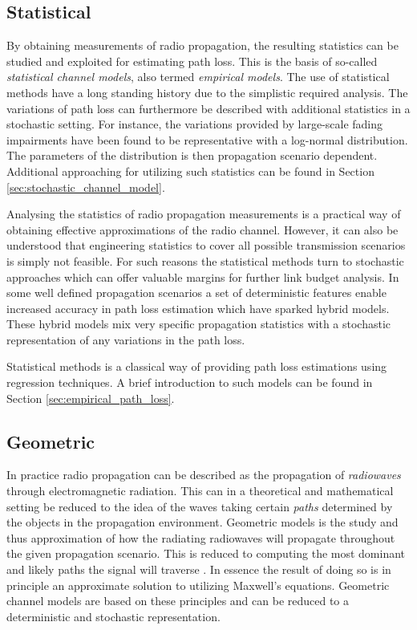 \subsection{Statistical}
By obtaining measurements of radio propagation, the resulting statistics can be studied and exploited for estimating path loss. This is the basis of so-called \emph{statistical channel models}, also termed \emph{empirical models}. The use of statistical methods have a long standing history due to the simplistic required analysis. The variations of path loss can furthermore be described with additional statistics in a stochastic setting. For instance, the variations provided by large-scale fading impairments have been found to be representative with a log-normal distribution. The parameters of the distribution is then propagation scenario dependent. Additional approaching for utilizing such statistics can be found in Section \ref{sec:stochastic_channel_model}.

Analysing the statistics of radio propagation measurements is a practical way of obtaining effective approximations of the radio channel. However, it can also be understood that engineering statistics to cover all possible transmission scenarios is simply not feasible. For such reasons the statistical methods turn to stochastic approaches which can offer valuable margins for further link budget analysis. In some well defined propagation scenarios a set of deterministic features enable increased accuracy in path loss estimation which have sparked hybrid models. These hybrid models mix very specific propagation statistics with a stochastic representation of any variations in the path loss. 

Statistical methods is a classical way of providing path loss estimations using regression techniques. A brief introduction to such models can be found in Section \ref{sec:empirical_path_loss}.


\subsection{Geometric}
In practice radio propagation can be described as the propagation of \emph{radiowaves} through electromagnetic radiation. This can in a theoretical and mathematical setting be reduced to the idea of the waves taking certain \emph{paths} determined by the objects in the propagation environment. Geometric models is the study and thus approximation of how the radiating radiowaves will propagate throughout the given propagation scenario. This is reduced to computing the most dominant and likely paths the signal will traverse \cite{Tse2005FundamentalsCommunication}. In essence the result of doing so is in principle an approximate solution to utilizing Maxwell's equations. Geometric channel models are based on these principles and can be reduced to a deterministic and stochastic representation.

